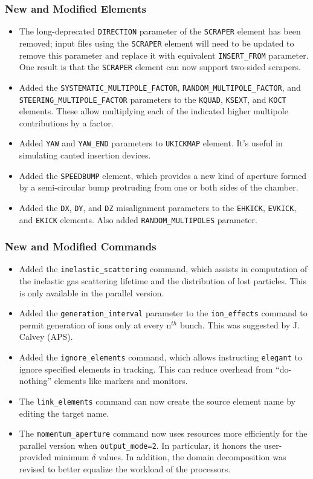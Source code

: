 \documentclass[11pt]{article}
\begin{document}
\subsubsection{New and Modified Elements}
\begin{itemize}
\item The long-deprecated \verb|DIRECTION| parameter of the \verb|SCRAPER| element has been removed; input files using the
  \verb|SCRAPER| element will  need to be updated to remove this parameter and replace it with
  equivalent \verb|INSERT_FROM| parameter.
  One result is that the \verb|SCRAPER| element can now support two-sided scrapers.
\item Added the \verb|SYSTEMATIC_MULTIPOLE_FACTOR|, \verb|RANDOM_MULTIPOLE_FACTOR|, and \verb|STEERING_MULTIPOLE_FACTOR|
  parameters to the \verb|KQUAD|, \verb|KSEXT|, and \verb|KOCT| elements. These allow multiplying each of the indicated 
  higher multipole contributions by a factor.
\item Added \verb|YAW| and \verb|YAW_END| parameters to \verb|UKICKMAP| element. It's useful in simulating canted insertion
  devices.
\item Added the \verb|SPEEDBUMP| element, which provides a new kind of aperture formed by a semi-circular bump 
  protruding from one or both sides of the chamber.
\item Added the \verb|DX|, \verb|DY|, and \verb|DZ| misalignment parameters to the \verb|EHKICK|, \verb|EVKICK|, and \verb|EKICK|
  elements. Also added \verb|RANDOM_MULTIPOLES| parameter.
\end{itemize}

\subsubsection{New and Modified Commands}
\begin{itemize}
\item Added the \verb|inelastic_scattering| command, which assists in computation of the inelastic gas scattering
  lifetime and the distribution of lost particles. This is only available in the parallel version.
\item Added the \verb|generation_interval| parameter to the \verb|ion_effects| command to permit generation of
  ions only at every n$^{th}$ bunch. This was suggested by J. Calvey (APS).
\item Added the \verb|ignore_elements| command, which allows instructing \verb|elegant| to ignore specified elements
  in tracking. This can reduce overhead from ``do-nothing'' elements like markers and monitors.
\item The \verb|link_elements| command can now create the source element name by editing the target name.
\item The \verb|momentum_aperture| command now uses resources more efficiently for the parallel version when 
  \verb|output_mode=2|. In particular, it honors the user-provided minimum $\delta$ values.
  In addition, the domain decomposition was revised to better equalize the workload of the processors.
\end{itemize}
\end{document}
